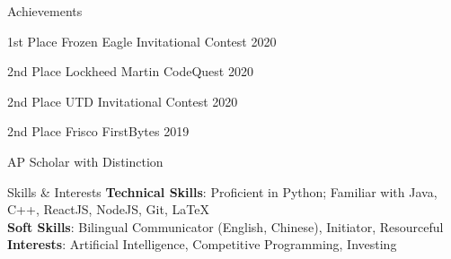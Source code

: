 \documentclass{resume} %
\begin{document}
\begin{rSection}{Achievements}
\begin{rSubsection}{}{}{}{}
    \item 1st Place Frozen Eagle Invitational Contest 2020
    \item 2nd Place Lockheed Martin CodeQuest 2020
    \item 2nd Place UTD Invitational Contest 2020
    \item 2nd Place Frisco FirstBytes 2019
    \item AP Scholar with Distinction
\end{rSubsection}
\end{rSection}


\begin{rSection}{Skills \& Interests}
{\bf Technical Skills}:
Proficient in Python; Familiar with Java, C++, ReactJS, NodeJS, Git, LaTeX \\
{\bf Soft Skills}:
Bilingual Communicator (English, Chinese), Initiator, Resourceful\\
{\bf Interests}:
Artificial Intelligence, Competitive Programming, Investing
\end{rSection}



\end{document}
